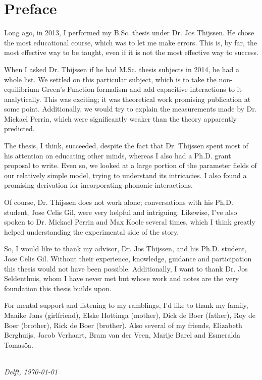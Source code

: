 \chapter*{Preface}

Long ago, in 2013, I performed my B.Sc. thesis under Dr. Jos Thijssen. He chose the most educational course, which was to let me make errors. This is, by far, the most effective way to be taught, even if it is not the most effective way to success.

When I asked Dr. Thijssen if he had M.Sc. thesis subjects in 2014, he had a whole list. We settled on this particular subject, which is to take the non-equilibrium Green's Function formalism and add capacitive interactions to it analytically.  This was exciting; it was theoretical work promising publication at some point. Additionally, we would try to explain the measurements made by Dr. Mickael Perrin, which were significantly weaker than the theory apparently predicted.

The thesis, I think, succeeded, despite the fact that Dr. Thijssen spent most of his attention on educating other minds, whereas I also had a Ph.D. grant proposal to write. Even so, we looked at a large portion of the parameter fields of our relatively simple model, trying to understand its intricacies. I also found a promising derivation for incorporating phononic interactions.

Of course, Dr. Thijssen does not work alone; conversations with his Ph.D. student, Jose Celis Gil, were very helpful and intriguing. Likewise, I've also spoken to Dr. Mickael Perrin and Max Koole several times, which I think greatly helped understanding the experimental side of the story. 

So, I would like to thank my advisor, Dr. Jos Thijssen, and his Ph.D. student, Jose Celis Gil. Without their experience, knowledge, guidance and participation this thesis would not have been possible. Additionally, I want to thank Dr. Jos Seldenthuis, whom I have never met but whose work and notes are the very foundation this thesis builds upon.

For mental support and listening to my ramblings, I'd like to thank my family, Maaike Jans (girlfriend), Elske Hottinga (mother), Dick de Boer (father), Roy de Boer (brother), Rick de Boer (brother). Also several of my friends, Elizabeth Berghuijs, Jacob Verhaart, Bram van der Veen, Marije Barel and Esmeralda Tomas\"oa.


\begin{flushright}
{\makeatletter\itshape
    \@firstname\ \@lastname \\
    Delft, \today
\makeatother}
\end{flushright}

